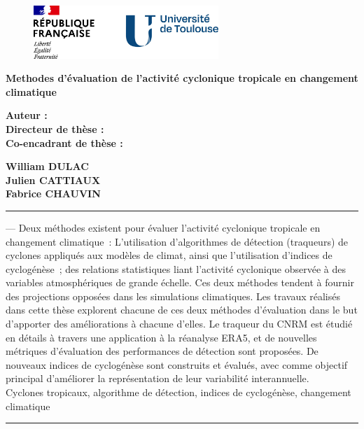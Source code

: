 \documentclass[../main.tex]{subfiles}
\begin{document}
\cleartoevenpage[\thispagestyle{empty}]
\thispagestyle{empty}

\begin{figure}[t!]
    \vspace{-6mm}
    \includegraphics[height=2cm]{include/logo_arriere.png}
\end{figure}
%
%
\begin{center}
\Large\textbf{Methodes d'évaluation de l'activité cyclonique tropicale en changement climatique\\}
\end{center}
\vspace{1cm}

	\begin{minipage}[t]{0.495\textwidth}
		\large{\textbf{Auteur :}} \\
		\large{\textbf{Directeur de thèse :}} \\
  		\large{\textbf{Co-encadrant de thèse :}}
	\end{minipage}
	\hfill{}
	\begin{minipage}[t]{0.495\textwidth}
		\large{\textbf{William DULAC}} \\
		\large{\textbf{Julien CATTIAUX}} \\
  		\large{\textbf{Fabrice CHAUVIN}}\\
	\end{minipage}

\vspace{5mm}
\noindent\rule[2pt]{\textwidth}{0.5pt}
 --- Deux méthodes existent pour évaluer l’activité cyclonique tropicale en changement climatique : L’utilisation
d’algorithmes de détection (traqueurs) de cyclones appliqués aux modèles de climat, ainsi que l’utilisation d’indices de cyclogénèse ; des relations
statistiques liant l’activité cyclonique observée à des variables atmosphériques de grande échelle. Ces deux méthodes tendent à fournir des projections opposées
dans les simulations climatiques. Les travaux réalisés dans cette thèse explorent chacune de ces deux méthodes d’évaluation dans le but d’apporter des
améliorations à chacune d’elles. Le traqueur du CNRM est étudié en détails à travers une application à la réanalyse ERA5, et de nouvelles métriques d’évaluation
des performances de détection sont proposées. De nouveaux indices de cyclogénèse sont construits et évalués, avec comme objectif principal d’améliorer la
représentation de leur variabilité interannuelle.\\
    Cyclones tropicaux, algorithme de détection, indices de cyclogénèse, changement climatique 
\\
\noindent\rule[2pt]{\textwidth}{0.5pt}
\end{document}
